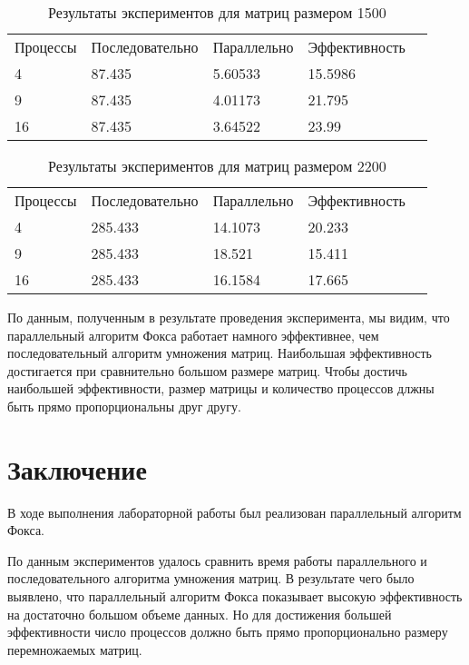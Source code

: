 \documentclass{report}
\begin{document}
\begin{table}[!h]
\caption{Результаты экспериментов для матриц размером 1500}
\centering
\begin{tabular}{lllll}
Процессы & Последовательно & Параллельно & Эффективность  \\
4        & 87.435         & 5.60533     & 15.5986       \\
9        & 87.435         & 4.01173     & 21.795       \\
16       & 87.435         & 3.64522     & 23.99       
\end{tabular}
\end{table}

\begin{table}[!h]
\caption{Результаты экспериментов для матриц размером 2200}
\centering
\begin{tabular}{lllll}
Процессы & Последовательно & Параллельно & Эффективность  \\
4        & 285.433         & 14.1073     & 20.233       \\
9        & 285.433         & 18.521     & 15.411       \\
16       & 285.433         & 16.1584     & 17.665       
\end{tabular}
\end{table}


\par По данным, полученным в результате проведения эксперимента, мы видим, что параллельный алгоритм Фокса работает намного эффективнее, чем последовательный алгоритм умножения матриц. Наибольшая эффективность достигается при
сравнительно большом размере матриц. Чтобы достичь наибольшей эффективности, размер матрицы и количество процессов длжны быть прямо пропорциональны друг другу.
\newpage

\section*{Заключение}
В ходе выполнения лабораторной работы был реализован параллельный алгоритм Фокса.
\par По данным экспериментов удалось сравнить время работы параллельного и последовательного алгоритма умножения матриц. В результате чего было выявлено, что параллельный алгоритм Фокса показывает высокую эффективность на достаточно большом объеме данных. Но для достижения большей эффективности число процессов должно быть прямо пропорционально размеру перемножаемых матриц.
\newpage
\end{document}

